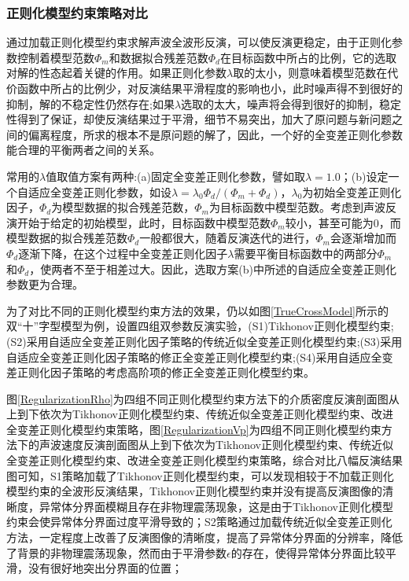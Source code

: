 \documentclass[12pt]{article}
\begin{document}
\subsubsection{正则化模型约束策略对比}
通过加载正则化模型约束求解声波全波形反演，可以使反演更稳定，由于正则化参数控制着模型范数$\Phi_m$和数据拟合残差范数$\Phi_d$在目标函数中所占的比例，它的选取对解的性态起着关键的作用。如果正则化参数$\lambda$取的太小，则意味着模型范数在代价函数中所占的比例少，对反演结果平滑程度的影响也小，此时噪声得不到很好的抑制，解的不稳定性仍然存在;如果$\lambda$选取的太大，噪声将会得到很好的抑制，稳定性得到了保证，却使反演结果过于平滑，细节不易突出，加大了原问题与新问题之间的偏离程度，所求的根本不是原问题的解了，因此，一个好的全变差正则化参数能合理的平衡两者之间的关系。
\par
常用的$\lambda$值取值方案有两种:(a)固定全变差正则化参数，譬如取$\lambda=1.0$；(b)设定一个自适应全变差正则化参数，如设$\lambda=\lambda_0 \Phi_d/(\Phi_m+\Phi_d)$，$\lambda_0$为初始全变差正则化因子，$\Phi_d$为模型数据的拟合残差范数，$\Phi_m$为目标函数中模型范数。考虑到声波反演开始于给定的初始模型，此时，目标函数中模型范数$\Phi_m$较小，甚至可能为$0$，而模型数据的拟合残差范数$\Phi_d$一般都很大，随着反演迭代的进行，$\Phi_m$会逐渐增加而$\Phi_d$逐渐下降，在这个过程中全变差正则化因子$\lambda$需要平衡目标函数中的两部分$\Phi_m$和$\Phi_d$，使两者不至于相差过大。因此，选取方案(b)中所述的自适应全变差正则化参数更为合理。
\par
为了对比不同的正则化模型约束方法的效果，仍以如图\ref{TrueCrossModel}所示的双“十”字型模型为例，设置四组双参数反演实验，(S1)Tikhonov正则化模型约束;(S2)采用自适应全变差正则化因子策略的传统近似全变差正则化模型约束;(S3)采用自适应全变差正则化因子策略的修正全变差正则化模型约束;(S4)采用自适应全变差正则化因子策略的考虑高阶项的修正全变差正则化模型约束。
\par
图\ref{RegularizationRho}为四组不同正则化模型约束方法下的介质密度反演剖面图从上到下依次为Tikhonov正则化模型约束、传统近似全变差正则化模型约束、改进全变差正则化模型约束策略，图\ref{RegularizationVp}为四组不同正则化模型约束方法下的声波速度反演剖面图从上到下依次为Tikhonov正则化模型约束、传统近似全变差正则化模型约束、改进全变差正则化模型约束策略，综合对比八幅反演结果图可知，S1策略加载了Tikhonov正则化模型约束，可以发现相较于不加载正则化模型约束的全波形反演结果，Tikhonov正则化模型约束并没有提高反演图像的清晰度，异常体分界面模糊且存在非物理震荡现象，这是由于Tikhonov正则化模型约束会使异常体分界面过度平滑导致的；S2策略通过加载传统近似全变差正则化方法，一定程度上改善了反演图像的清晰度，提高了异常体分界面的分辨率，降低了背景的非物理震荡现象，然而由于平滑参数$\epsilon$的存在，使得异常体分界面比较平滑，没有很好地突出分界面的位置；
\end{document}
